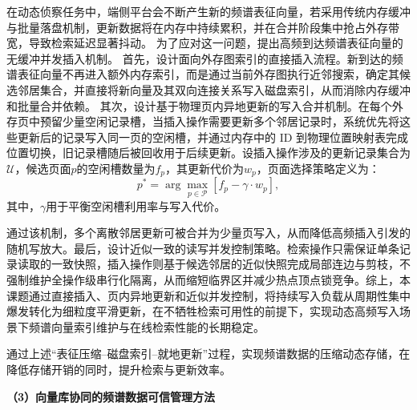 在动态侦察任务中，端侧平台会不断产生新的频谱表征向量，若采用传统内存缓冲与批量落盘机制，更新数据将在内存中持续累积，并在合并阶段集中抢占外存带宽，导致检索延迟显著抖动。
为了应对这一问题，提出高频到达频谱表征向量的无缓冲并发插入机制。
首先，设计面向外存图索引的直接插入流程。新到达的频谱表征向量不再进入额外内存索引，而是通过当前外存图执行近邻搜索，确定其候选邻居集合，并直接将新向量及其双向连接关系写入磁盘索引，从而消除内存缓冲和批量合并依赖。
其次，设计基于物理页内异地更新的写入合并机制。在每个外存页中预留少量空闲记录槽，当插入操作需要更新多个邻居记录时，系统优先将这些更新后的记录写入同一页的空闲槽，并通过内存中的 ID 到物理位置映射表完成位置切换，旧记录槽随后被回收用于后续更新。设插入操作涉及的更新记录集合为$\mathcal{U}$，候选页面$p$的空闲槽数量为$f_p$，其更新代价为$w_p$，页面选择策略定义为：
\begin{equation}
	p^*=\arg\max_{p\in\mathcal{P}}\left[f_p-\gamma\cdot w_p\right],
\end{equation}
其中，$\gamma$用于平衡空闲槽利用率与写入代价。

通过该机制，多个离散邻居更新可被合并为少量页写入，从而降低高频插入引发的随机写放大。最后，设计近似一致的读写并发控制策略。检索操作只需保证单条记录读取的一致快照，插入操作则基于候选邻居的近似快照完成局部连边与剪枝，不强制维护全操作级串行化隔离，从而缩短临界区并减少热点顶点锁竞争。综上，本课题通过直接插入、页内异地更新和近似并发控制，将持续写入负载从周期性集中爆发转化为细粒度平滑更新，在不牺牲检索可用性的前提下，实现动态高频写入场景下频谱向量索引维护与在线检索性能的长期稳定。

通过上述“表征压缩--磁盘索引--就地更新”过程，实现频谱数据的压缩动态存储，在降低存储开销的同时，提升检索与更新效率。

\textbf{（3）向量库协同的频谱数据可信管理方法}



